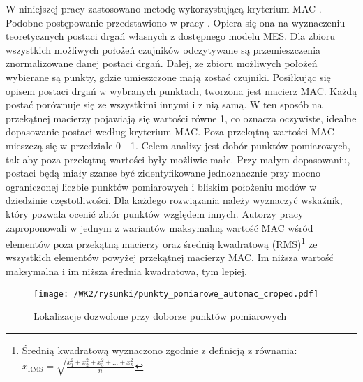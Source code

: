 W niniejszej pracy zastosowano metodę wykorzystującą kryterium MAC \parencite{Penny1994}. Podobne postępowanie przedstawiono w pracy \cite{Poprawa2018}. Opiera się ona na wyznaczeniu teoretycznych postaci drgań własnych z dostępnego modelu MES. Dla zbioru wszystkich możliwych położeń czujników odczytywane są przemieszczenia znormalizowane danej postaci drgań. Dalej, ze zbioru możliwych położeń wybierane są punkty, gdzie umieszczone mają zostać czujniki. Posiłkując się opisem postaci drgań w wybranych punktach, tworzona jest macierz MAC. Każdą postać porównuje się ze wszystkimi innymi i z nią samą. W ten sposób na przekątnej macierzy pojawiają się wartości równe 1, co oznacza oczywiste, idealne dopasowanie postaci według kryterium MAC. Poza przekątną wartości MAC mieszczą się w przedziale 0 - 1. Celem analizy jest dobór punktów pomiarowych, tak aby poza przekątną wartości były możliwie małe. Przy małym dopasowaniu, postaci będą miały szanse być zidentyfikowane jednoznacznie przy mocno ograniczonej liczbie punktów pomiarowych i bliskim położeniu modów w dziedzinie częstotliwości. Dla każdego rozwiązania należy wyznaczyć wskaźnik, który pozwala ocenić zbiór punktów względem innych. Autorzy pracy \cite{Penny1994} zaproponowali w jednym z wariantów maksymalną wartość MAC wśród elementów poza przekątną macierzy oraz średnią kwadratową (RMS)\footnote{
	Średnią kwadratową wyznaczono zgodnie z definicją z równania: $x_{\text{RMS}}=\sqrt{\frac{x_1^2+x_2^2+x_3^2+\dots+x_n^2}{n}}$} 
ze wszystkich elementów powyżej przekątnej macierzy MAC. Im niższa wartość maksymalna i im niższa średnia kwadratowa, tym lepiej.
\begin{figure}[hbt!]
	\centering
	\texttt{[image: /WK2/rysunki/punkty\_pomiarowe\_automac\_croped.pdf]}
	\captionsetup{justification=centering}
	\caption{Lokalizacje dozwolone przy doborze punktów pomiarowych}
	\label{fig: wk2_automac_points_all}
\end{figure}

